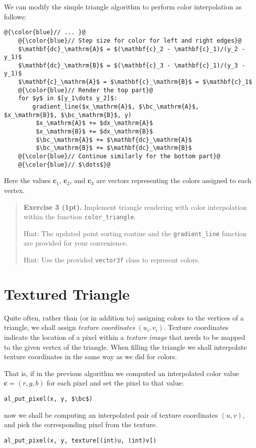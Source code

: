 \documentclass{article}
\newenvironment{exercise}[2]{\begin{verse}\textbf{Exercise #1 (#2pt).} }{
\end{verse}\medskip}
\newcommand{\bc}{\mathbf{c}}
\begin{document}
We can modify the simple triangle algorithm to perform color interpolation as follows:
\begin{lstlisting}[escapechar=@]
	@{\color{blue}// ... }@
	@{\color{blue}// Step size for color for left and right edges}@
	$\mathbf{dc}_\mathrm{A}$ = $(\mathbf{c}_2 - \mathbf{c}_1)/(y_2 - y_1)$
	$\mathbf{dc}_\mathrm{B}$ = $(\mathbf{c}_3 - \mathbf{c}_1)/(y_3 - y_1)$
	$\mathbf{c}_\mathrm{A}$ = $\mathbf{c}_\mathrm{B}$ = $\mathbf{c}_1$
	@{\color{blue}// Render the top part}@
	for $y$ in $[y_1\dots y_2]$:
		gradient_line($x_\mathrm{A}$, $\bc_\mathrm{A}$, $x_\mathrm{B}$, $\bc_\mathrm{B}$, y)
		 $x_\mathrm{A}$ += $dx_\mathrm{A}$
		 $x_\mathrm{B}$ += $dx_\mathrm{B}$
		 $\bc_\mathrm{A}$ += $\mathbf{dc}_\mathrm{A}$
		 $\bc_\mathrm{B}$ += $\mathbf{dc}_\mathrm{B}$
	@{\color{blue}// Continue similarly for the bottom part}@
	@{\color{blue}// $\dots$}@
\end{lstlisting}

Here the values $\bc_1$, $\bc_2$, and $\bc_3$ are vectors representing the colors assigned to each vertex.

\begin{exercise}{3}{1}
Implement triangle rendering with color interpolation within the function \verb#color_triangle#.

Hint: The updated point sorting routine and the \verb#gradient_line# function are provided for your convenience.

Hint: Use the provided \verb#vector3f# class to represent colors.
\end{exercise}

\section{Textured Triangle}
Quite often, rather than (or in addition to) assigning colors to the vertices of a triangle, we shall assign \emph{texture coordinates} $(u_i, v_i)$. Texture coordinates indicate the location of a pixel within a \emph{texture image} that needs to be mapped to the given vertex of the triangle. When filling the triangle we shall interpolate texture coordinates in the same way as we did for colors.

That is, if in the previous algorithm we computed an interpolated color value $\bc = (r,g,b)$ for each pixel and set the pixel to that value:
\begin{lstlisting}[escapechar=@]
	al_put_pixel(x, y, $\bc$)
\end{lstlisting}
now we shall be computing an interpolated pair of texture coordinates $(u, v)$, and pick the corresponding pixel from the texture.
\begin{lstlisting}[escapechar=@]
	al_put_pixel(x, y, texture[(int)u, (int)v])
\end{lstlisting}
\end{document}
